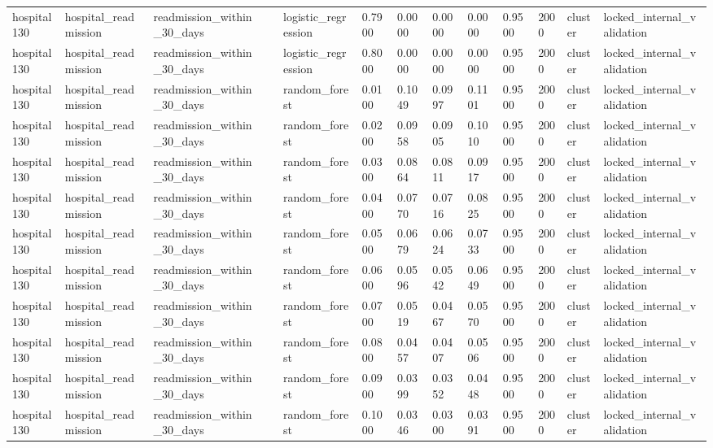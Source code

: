 \begin{tabular}{lllllllllllll}
hospital130 & hospital\_readmission & readmission\_within\_30\_days &  & logistic\_regression & 0.7900 & 0.0000 & 0.0000 & 0.0000 & 0.9500 & 2000 & cluster & locked\_internal\_validation \\
hospital130 & hospital\_readmission & readmission\_within\_30\_days &  & logistic\_regression & 0.8000 & 0.0000 & 0.0000 & 0.0000 & 0.9500 & 2000 & cluster & locked\_internal\_validation \\
hospital130 & hospital\_readmission & readmission\_within\_30\_days &  & random\_forest & 0.0100 & 0.1049 & 0.0997 & 0.1101 & 0.9500 & 2000 & cluster & locked\_internal\_validation \\
hospital130 & hospital\_readmission & readmission\_within\_30\_days &  & random\_forest & 0.0200 & 0.0958 & 0.0905 & 0.1010 & 0.9500 & 2000 & cluster & locked\_internal\_validation \\
hospital130 & hospital\_readmission & readmission\_within\_30\_days &  & random\_forest & 0.0300 & 0.0864 & 0.0811 & 0.0917 & 0.9500 & 2000 & cluster & locked\_internal\_validation \\
hospital130 & hospital\_readmission & readmission\_within\_30\_days &  & random\_forest & 0.0400 & 0.0770 & 0.0716 & 0.0825 & 0.9500 & 2000 & cluster & locked\_internal\_validation \\
hospital130 & hospital\_readmission & readmission\_within\_30\_days &  & random\_forest & 0.0500 & 0.0679 & 0.0624 & 0.0733 & 0.9500 & 2000 & cluster & locked\_internal\_validation \\
hospital130 & hospital\_readmission & readmission\_within\_30\_days &  & random\_forest & 0.0600 & 0.0596 & 0.0542 & 0.0649 & 0.9500 & 2000 & cluster & locked\_internal\_validation \\
hospital130 & hospital\_readmission & readmission\_within\_30\_days &  & random\_forest & 0.0700 & 0.0519 & 0.0467 & 0.0570 & 0.9500 & 2000 & cluster & locked\_internal\_validation \\
hospital130 & hospital\_readmission & readmission\_within\_30\_days &  & random\_forest & 0.0800 & 0.0457 & 0.0407 & 0.0506 & 0.9500 & 2000 & cluster & locked\_internal\_validation \\
hospital130 & hospital\_readmission & readmission\_within\_30\_days &  & random\_forest & 0.0900 & 0.0399 & 0.0352 & 0.0448 & 0.9500 & 2000 & cluster & locked\_internal\_validation \\
hospital130 & hospital\_readmission & readmission\_within\_30\_days &  & random\_forest & 0.1000 & 0.0346 & 0.0300 & 0.0391 & 0.9500 & 2000 & cluster & locked\_internal\_validation \\

\end{tabular}
